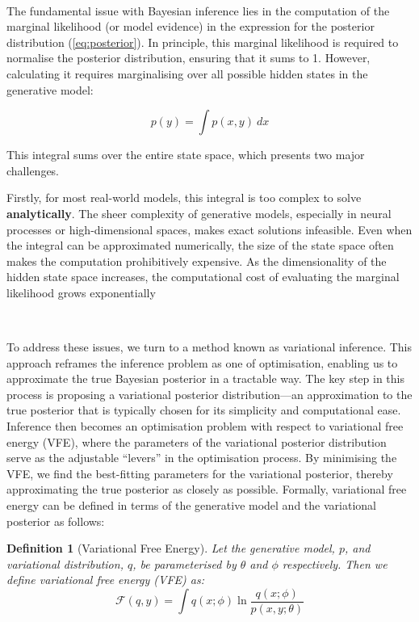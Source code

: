 \documentclass{article}
\newcommand{\refp}[1]{(\ref{#1})}
\newtheorem{definition}{Definition}
\begin{document}
\

The fundamental issue with Bayesian inference lies in the computation of the marginal likelihood (or model evidence) in the expression for the posterior distribution \refp{eq:posterior}. In principle, this marginal likelihood is required to normalise the posterior distribution, ensuring that it sums to 1. However, calculating it requires marginalising over all possible hidden states in the generative model:

\begin{equation}
	p(y) = \int p(x, y) \ dx
\end{equation}

This integral sums over the entire state space, which presents two major challenges. 

Firstly, for most real-world models, this integral is too complex to solve \textbf{analytically}. The sheer complexity of generative models, especially in neural processes or high-dimensional spaces, makes exact solutions infeasible. Even when the integral can be approximated numerically, the size of the state space often makes the computation prohibitively expensive. As the dimensionality of the hidden state space increases, the computational cost of evaluating the marginal likelihood grows exponentially

\

To address these issues, we turn to a method known as variational inference. This approach reframes the inference problem as one of optimisation, enabling us to approximate the true Bayesian posterior in a tractable way. The key step in this process is proposing a variational posterior distribution—an approximation to the true posterior that is typically chosen for its simplicity and computational ease. Inference then becomes an optimisation problem with respect to variational free energy (VFE), where the parameters of the variational posterior distribution serve as the adjustable ``levers'' in the optimisation process. By minimising the VFE, we find the best-fitting parameters for the variational posterior, thereby approximating the true posterior as closely as possible. Formally, variational free energy can be defined in terms of the generative model and the variational posterior as follows:

\begin{definition}[Variational Free Energy]\label{def:variational_free_energy}
Let the generative model, $p$, and variational distribution, $q$, be parameterised by $\theta$ and $\phi$ respectively. Then we define variational free energy (VFE) as:
	$$
	\mathcal{F}(q, y) =  \int q(x; \phi) \ln \frac{q(x; \phi)}{p(x, y; \theta)}
	$$
\end{definition}
\end{document}
